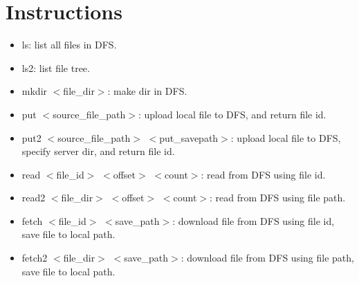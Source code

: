 \documentclass{article}
\begin{document}
\section{Instructions}
\begin{itemize}
    \item ls: list all files in DFS.
    \item ls2: list file tree.
    \item mkdir $<$file\_dir$>$: make dir in DFS.
    \item put $<$source\_file\_path$>$: upload local file to DFS, and return file id.
    \item put2 $<$source\_file\_path$>$ $<$put\_savepath$>$: upload local file to DFS, specify server dir, and return file id.
    \item read $<$file\_id$>$ $<$offset$>$ $<$count$>$: read from DFS using file id.
    \item read2 $<$file\_dir$>$ $<$offset$>$ $<$count$>$: read from DFS using file path.
    \item fetch $<$file\_id$>$ $<$save\_path$>$: download file from DFS using file id, save file to local path.
    \item fetch2 $<$file\_dir$>$ $<$save\_path$>$: download file from DFS using file path, save file to local path.
\end{itemize}
\end{document}

